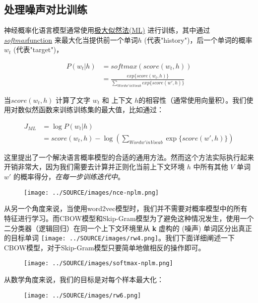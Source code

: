 \subsection{处理噪声对比训练}\label{ux5904ux7406ux566aux58f0ux5bf9ux6bd4ux8badux7ec3}

神经概率化语言模型通常使用\href{https://en.wikipedia.org/wiki/Maximum_likelihood}{极大似然法(ML)} 进行训练，其中通过\href{https://en.wikipedia.org/wiki/Softmax_function}{\emph{softmax}function} 来最大化当提供前一个单词$h$ (代表"history")，后一个单词的概率$w_t$ (代表"target")，

\begin{align}
P(w_t|h) & = softmax(score(w_t,h)) \\
         & = \frac{exp\{score(w_t,h)\}}{\sum_{Word w'in Vocab}{exp\{score(w',h)\}}}
\end{align}

当$score(w_t,h)$ 计算了文字 $w_t$ 和 上下文 $h$的相容性（通常使用向量积）。我们使用对数似然函数来训练训练集的最大值，比如通过：

\begin{align}
J_{ML} & = \log{P(w_t|h)} \\
       & = score(w_t,h) - \log{(\sum_{Word w'in Vocab}{\exp{\{score(w',h)\}}})}
\end{align}

这里提出了一个解决语言概率模型的合适的通用方法。然而这个方法实际执行起来开销非常大，因为我们需要去计算并正则化当前上下文环境 $h$ 中所有其他 $V$ 单词 $w'$ 的概率得分，\emph{在每一步训练迭代中}。

\begin{figure}[htbp]
\centering
\texttt{[image: ../SOURCE/images/nce-nplm.png]}
\caption{}
\end{figure}

从另一个角度来说，当使用word2vec模型时，我们并不需要对概率模型中的所有特征进行学习。而CBOW模型和Skip-Gram模型为了避免这种情况发生，使用一个二分类器（逻辑回归）在同一个上下文环境里从
\textbf{k} 虚构的 (噪声) 单词区分出真正的目标单词
\texttt{[image: ../SOURCE/images/rw4.png]}。我们下面详细阐述一下CBOW模型，对于Skip-Gram模型只要简单地做相反的操作即可。

\begin{figure}[htbp]
\centering
\texttt{[image: ../SOURCE/images/softmax-nplm.png]}
\caption{}
\end{figure}

从数学角度来说，我们的目标是对每个样本最大化：

\begin{figure}[htbp]
\centering
\texttt{[image: ../SOURCE/images/rw6.png]}
\caption{}
\end{figure}

